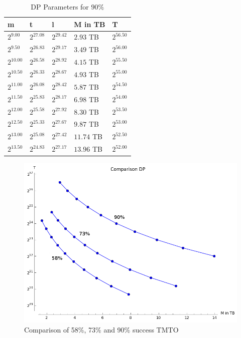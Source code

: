 \begin{table}[H]
  \centering
\begin{tabular}{lllll}
m & t & l & M in TB & T \\\hline
$2^{9.00}$ & $2^{27.08}$ & $2^{29.42}$ & $2.93$ TB & $2^{56.50}$ \\
$2^{9.50}$ & $2^{26.83}$ & $2^{29.17}$ & $3.49$ TB & $2^{56.00}$ \\
$2^{10.00}$ & $2^{26.58}$ & $2^{28.92}$ & $4.15$ TB & $2^{55.50}$ \\
$2^{10.50}$ & $2^{26.33}$ & $2^{28.67}$ & $4.93$ TB & $2^{55.00}$ \\
$2^{11.00}$ & $2^{26.08}$ & $2^{28.42}$ & $5.87$ TB & $2^{54.50}$ \\
$2^{11.50}$ & $2^{25.83}$ & $2^{28.17}$ & $6.98$ TB & $2^{54.00}$ \\
$2^{12.00}$ & $2^{25.58}$ & $2^{27.92}$ & $8.30$ TB & $2^{53.50}$ \\
$2^{12.50}$ & $2^{25.33}$ & $2^{27.67}$ & $9.87$ TB & $2^{53.00}$ \\
$2^{13.00}$ & $2^{25.08}$ & $2^{27.42}$ & $11.74$ TB & $2^{52.50}$ \\
$2^{13.50}$ & $2^{24.83}$ & $2^{27.17}$ & $13.96$ TB & $2^{52.00}$ \\
\end{tabular}
\caption{DP Parameters for $90\%$}
\end{table}

\begin{figure}[H]
  \centering
  \includegraphics[scale=0.4]{figures/compareDP.png}
  \caption{Comparison of 58\%, 73\% and 90\% success TMTO}
  \label{fig:comparisonhell2.25}
\end{figure}




